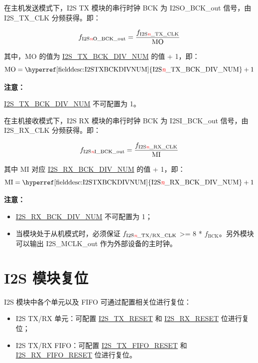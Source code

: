 \documentclass[main\_\_CN.tex]{subfiles}
\begin{document}
在主机发送模式下，I2S TX 模块的串行时钟 BCK 为 I2SO\_BCK\_out 信号，由 I2S\_TX\_CLK 分频获得。即：

$$f_{\textrm{I2S\textcolor{red}{\it{n}}O\_BCK\_out}} = \frac{f_{\textrm{I2S\textcolor{red}{\it{n}}\_TX\_CLK}}}{\textrm{MO}}$$


其中，MO 的值为 \hyperref[fielddesc:I2STXBCKDIVNUM]{I2S\_TX\_BCK\_DIV\_NUM} 的值 + 1，即：
$$ \textrm{MO} = \textrm{\hyperref[fielddesc:I2STXBCKDIVNUM]{I2S\regindex{n}\_TX\_BCK\_DIV\_NUM}} + 1 $$

{\bfseries 注意：}

\hyperref[fielddesc:I2STXBCKDIVNUM]{I2S\_TX\_BCK\_DIV\_NUM} 不可配置为 1。

在主机接收模式下，I2S RX 模块的串行时钟 BCK 为 I2SI\_BCK\_out 信号，由 I2S\_RX\_CLK 分频获得。即：

$$f_{\textrm{I2S\textcolor{red}{\it{n}}I\_BCK\_out}} = \frac{f_{\textrm{I2S\textcolor{red}{\it{n}}\_RX\_CLK}}}{\textrm{MI}}$$

其中 MI 对应 \hyperref[fielddesc:I2SRXBCKDIVNUM]{I2S\_RX\_BCK\_DIV\_NUM} 的值 + 1，即：
$$ \textrm{MI} = \textrm{\hyperref[fielddesc:I2STXBCKDIVNUM]{I2S\regindex{n}\_RX\_BCK\_DIV\_NUM}} + 1 $$


{\bfseries 注意：}
\begin{itemize}
    \item \hyperref[fielddesc:I2SRXBCKDIVNUM]{I2S\_RX\_BCK\_DIV\_NUM} 不可配置为 1；
    \item 当模块处于从机模式时，必须保证 $f_{\textrm{I2S\textcolor{red}{\it{n}}\_TX/RX\_CLK}}$ >= 8 * $f_{\textrm{BCK}}$。另外模块可以输出 I2S\_MCLK\_out 作为外部设备的主时钟。

\end{itemize}

\section{I2S 模块复位} \label{i2s_module_reset}

I2S 模块中各个单元以及 FIFO 可通过配置相关位进行复位：
\begin{itemize}
\item I2S TX/RX 单元：可配置 \hyperref[fielddesc:I2STXRESET]{I2S\_TX\_RESET} 和 \hyperref[fielddesc:I2SRXRESET]{I2S\_RX\_RESET} 位进行复位；
\item I2S TX/RX FIFO：可配置 \hyperref[fielddesc:I2STXFIFORESET]{I2S\_TX\_FIFO\_RESET} 和 \hyperref[fielddesc:I2SRXFIFORESET]{I2S\_RX\_FIFO\_RESET} 位进行复位。
\end{itemize}
\end{document}
